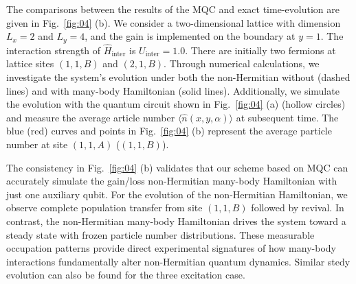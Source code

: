 \documentclass[longbibliography, aps, prx, amsmath, amssymb, amsfonts, twocolumn,superscriptaddress, footinbib]{revtex4-1}
\begin{document}
	The comparisons between the results of the MQC and exact time-evolution are given in Fig.~\ref{fig:04} (b). 
	We consider a two-dimensional lattice with dimension $L_x=2$ and $L_y=4$, and the gain is implemented on the boundary at $y=1$. The interaction strength of $\hat{H}_{\text{inter}}$ is $U_{\text{inter}}=1.0$.
	There are initially two fermions at lattice sites $(1,1,B)$ and $(2,1,B)$. Through numerical calculations, we investigate the system's evolution under both the non-Hermitian without (dashed lines) and with many-body Hamiltonian (solid lines). Additionally, we simulate the evolution with the quantum circuit shown in Fig.~\ref{fig:04} (a) (hollow circles) and measure the average article number $\langle \hat{n}(x,y,\alpha)\rangle$ at subsequent time. The blue (red) curves and points in Fig.~\ref{fig:04} (b) represent the average particle number at site $(1,1,A)$ ($(1,1,B)$).

	The consistency in Fig.~\ref{fig:04} (b) validates that our scheme based on MQC can accurately simulate the gain/loss non-Hermitian many-body Hamiltonian with just one auxiliary qubit. 
	For the evolution of the non-Hermitian Hamiltonian, we observe complete population transfer from site $(1,1,B)$ followed by revival.
	In contrast, the non-Hermitian many-body Hamiltonian drives the system toward a steady state with frozen particle number distributions.
	These measurable occupation patterns provide direct experimental signatures of how many-body interactions fundamentally alter non-Hermitian quantum dynamics. Similar stedy evolution can also be found for the three excitation case.
	
\end{document}
